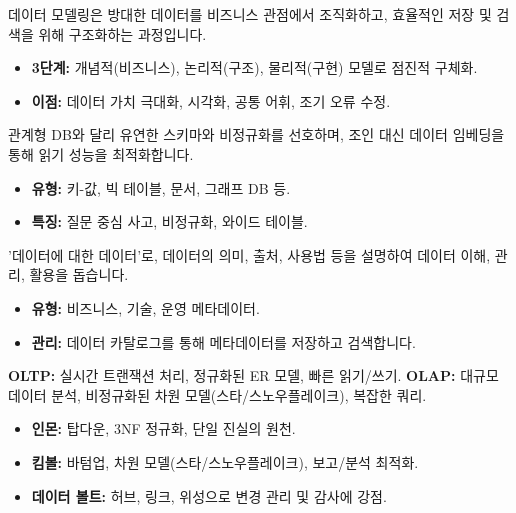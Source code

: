 \documentclass[11pt,a4paper]{article}
\begin{document}
\begin{tcolorbox}[mybox, title=데이터 모델링의 핵심]
데이터 모델링은 방대한 데이터를 비즈니스 관점에서 조직화하고, 효율적인 저장 및 검색을 위해 구조화하는 과정입니다.
\begin{itemize}
    \item \textbf{3단계:} 개념적(비즈니스), 논리적(구조), 물리적(구현) 모델로 점진적 구체화.
    \item \textbf{이점:} 데이터 가치 극대화, 시각화, 공통 어휘, 조기 오류 수정.
\end{itemize}
\end{tcolorbox}

\begin{tcolorbox}[mybox, title=NoSQL 모델링]
관계형 DB와 달리 유연한 스키마와 비정규화를 선호하며, 조인 대신 데이터 임베딩을 통해 읽기 성능을 최적화합니다.
\begin{itemize}
    \item \textbf{유형:} 키-값, 빅 테이블, 문서, 그래프 DB 등.
    \item \textbf{특징:} 질문 중심 사고, 비정규화, 와이드 테이블.
\end{itemize}
\end{tcolorbox}

\begin{tcolorbox}[mybox, title=메타데이터의 중요성]
'데이터에 대한 데이터'로, 데이터의 의미, 출처, 사용법 등을 설명하여 데이터 이해, 관리, 활용을 돕습니다.
\begin{itemize}
    \item \textbf{유형:} 비즈니스, 기술, 운영 메타데이터.
    \item \textbf{관리:} 데이터 카탈로그를 통해 메타데이터를 저장하고 검색합니다.
\end{itemize}
\end{tcolorbox}

\begin{tcolorbox}[mybox, title=OLTP vs. OLAP]
\textbf{OLTP:} 실시간 트랜잭션 처리, 정규화된 ER 모델, 빠른 읽기/쓰기.
\textbf{OLAP:} 대규모 데이터 분석, 비정규화된 차원 모델(스타/스노우플레이크), 복잡한 쿼리.
\end{tcolorbox}

\begin{tcolorbox}[mybox, title=데이터 웨어하우스 모델링]
\begin{itemize}
    \item \textbf{인몬:} 탑다운, 3NF 정규화, 단일 진실의 원천.
    \item \textbf{킴볼:} 바텀업, 차원 모델(스타/스노우플레이크), 보고/분석 최적화.
    \item \textbf{데이터 볼트:} 허브, 링크, 위성으로 변경 관리 및 감사에 강점.
\end{itemize}
\end{tcolorbox}
\end{document}
